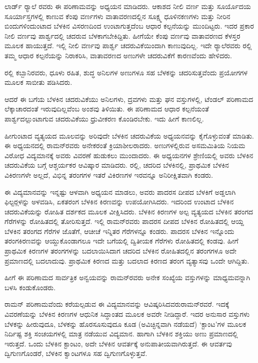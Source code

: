ಲಾರ್ಡ್ ರ‍್ಯಾಲೆ ರವರು ಈ ಪರಿಣಾಮವನ್ನು ಅಧ್ಯಯನ ಮಾಡಿದರು. ಆಕಾಶದ ನೀಲಿ ವರ್ಣ ಮತ್ತು ಸೂರ್ಯೊದಯ ಸೂರ್ಯಾಸ್ತಗಳಲ್ಲಿ ಕಾಣುವ ಕೆಂಪು ವರ್ಣಗಳು ವಾತಾವರಣದಲ್ಲಿನ ಸೂಕ್ಷ್ಮ ಧೂಳಿನಕಣಗಳು ಮತ್ತು ನೀರಿನ ಬಿಂದುಗಳಿಂದುಂಟಾದ ಬೆಳಕಿನ ವಿಸರಣದಿಂದ ಉಂಟಾಗುತ್ತದೆಂಬ ಆಧಾರ ಕಲ್ಪನೆಯನ್ನು ಮುಂದಿಟ್ಟರು. ಇದರ ಪ್ರಕಾರ ನೀಲಿ ವರ್ಣವು ಪಾರ್ಶ್ವದಲ್ಲಿ ಚದರುವ ಬೆಳಕಾಗಬೇಕಿದ್ದಿತು. ಹೀಗೆಯೇ ಕೆಂಪು ವರ್ಣವು ವಾತಾವರಣದ ಕೆಳಸ್ತರ ಮೂಲಕ ಹಾಯುತ್ತದೆ. ಇಲ್ಲಿ ನೀಲಿ ವರ್ಣವು ಪಾರ್ಶ್ವ ಚದರುವಿಕೆಯಿಂದಾಗಿ ಕಾಣುವುದಿಲ್ಲ. ಇದೇ ರ‍್ಯಾಲೆರವರು ರಲ್ಲಿ ತಮ್ಮ ಆಧಾರ ಕಲ್ಪನೆಯನ್ನು ನಿರಾಕರಿಸಿ, ವಾತಾವರಣದ ಅಣುಗಳೇ ಚದರುವಿಕೆಗೆ ಕಾರಣವೆಂದು ಹೇಳಿದರು.

\vskip 1pt

ರಲ್ಲಿ ಕಬ್ಬಾನಿರವರು, ಧೂಳು ರಹಿತ, ಶುದ್ಧ ಅನಿಲಗಳ ಅಣುಗಳೂ ಸಹ ಬೆಳಕನ್ನು ಚದರಿಸುತ್ತವೆಂದು ಪ್ರಯೋಗಗಳ ಮೂಲಕ ಸಾಬೀತು ಪಡಿಸಿದರು.

\vskip 1pt

ಆದರೆ ಈ ಬಗೆಯ ಬೆಳಕಿನ ಚದರುವಿಕೆಯು ಅನಿಲಗಳು, ದ್ರವಗಳು ಮತ್ತು ಘನ ವಸ್ತುಗಳಲ್ಲಿ, ಟೆಂಡಲ್ ಪರಿಣಾಮದ ಲೆಕ್ಕಾಚಾರದಂತೆ ಇರುವುದಿಲ್ಲವೆಂಬ ಅಂಶವು ತಿಳಿಯಿತು. ಈ ಪರಿಣಾಮದ ಆಧಾರ ಕಲ್ಪನೆಯಂತೆ ಪಾರ್ಶ್ವದಲ್ಲುಂಟಾಗುವ ಚದರುವಿಕೆಯು ಧ್ರುವೀಕರಣ ಕೊಂಡಿರಬೇಕು. ಇದು ಹೀಗೆ ಕಾಣಲಿಲ್ಲ.

\vskip 1pt

ಹೀಗುಂಟಾದ ವ್ಯತ್ಯಯದ ಮೂಲವನ್ನು ಅರಿವುದೇ ಬೆಳಕಿನ ಚದರುವಿಕೆಯ ಅಧ್ಯಯನವನ್ನು ಕೈಗೊಳ್ಳುವಂತೆ ಮಾಡಿತು. ಈ ಅಧ್ಯಯನದಲ್ಲಿ ರಾಮನ್‍ರವರು ಅನೇಕರಂತೆ ಕ್ರಿಯಾಶೀಲರಾದರು. ಅಣುಗಳಲ್ಲಿರುವ ಅಸಮಮಿತಿಯ ನಿಯಮ ವಿರೋಧ ವಿದ್ಯಮಾನಕ್ಕೆ ಅವರು ವಿವರಣೆ ಹುಡುಕಲು ಮುಂದಾದರು. ಈ ಅಧ್ಯಯನಗಳ ಶ್ರೇಣಿಯಲ್ಲಿ ಅವರು ಬೆಳಕಿನ ಚದರುವಿಕೆಯ ಬಗ್ಗೆ ಆಶ್ಚರ್ಯಕರ ಆವಿಷ್ಕಾರ ಮಾಡಿದರು. ರಲ್ಲಿ, ಚದರಿದ ಬೆಳಕಿನಲ್ಲಿ, ಪ್ರಾಥಮಿಕ ಬೆಳಕಿನ ವಿಕಿರಣಗಳೇ ಅಲ್ಲದೆ, ವಿಭಿನ್ನ ತರಂಗಗಳ ಇತರೆ ವಿಕಿರಣಗಳ ಇರವನ್ನೂ ಅನಿರೀಕ್ಷಿತವಾಗಿ ಕಂಡರು.

ಈ ವಿದ್ಯಮಾನವನ್ನು ಇನ್ನಷ್ಟು ಆಳವಾಗಿ ಅಧ್ಯಯನ ಮಾಡಲು, ಅವರು ಪಾದರಸ ದೀಪದ ಬೆಳಕಿಗೆ ಅಡ್ಡಲಾಗಿ ಫಿಲ್ಟರ್‍ಗಳನ್ನು ಅಳವಡಿಸಿ, ಏಕತರಂಗ ಬೆಳಕಿನ ಕಿರಣವನ್ನು ಉಪಯೋಗಿಸಿದರು. ಇದರಿಂದ ಉಂಟಾದ ಬೆಳಕಿನ ಚದರುವಿಕೆಯನ್ನು ರೋಹಿತ ದರ್ಶಕದ ಮೂಲಕ ವೀಕ್ಷಿಸಿದರು. ಬೆಳಕಿನ ಕಿರಣಗಳ ಅಲ್ಪ ವ್ಯತ್ಯಯದ ಬೆಳಕಿನ ತರಂಗದ ಗೆರೆಗಳನ್ನು ರೋಹಿತದಲ್ಲಿ ತೋರಿಸುತ್ತದೆ. ಇಲ್ಲಿ ರಾಮನ್‍ರವರು ಪಾದರಸ ದೀಪದ ಬೆಳಕಿನ ರೋಹಿತದಲ್ಲಿ ಆಯ್ದ ಬೆಳಕಿನ ತರಂಗದ ಗೆರೆಗಳ ಜೊತೆಗೆ, ಆಚೀಚೆ ಇನ್ನಿತರ ಗೆರೆಗಳನ್ನೂ ಕಂಡರು. ಪಾದರಸ ಬೆಳಕಿನ ಇನ್ನೊಂದು ತರಂಗ\enginline{-}ಕಿರಣವನ್ನು ಆಯ್ದುಕೊಂಡಾಗಲೂ ಇದೇ ಬಗೆಯಲ್ಲಿ ದ್ವಿತೀಯಕ ಗೆರೆಗಳು ರೋಹಿತದಲ್ಲಿ ಕಂಡವು. ಹೀಗೆ ಪ್ರಾಥಮಿಕ ಕಿರಣಗಳ ತರಂಗಗಳನ್ನು ಬದಲಾಯಿಸಿದಾಗ ಚದರಿದ ಬೆಳಕಿನ ರೋಹಿತದಲ್ಲಿನ ತರಂಗಗಳೂ ಅದೇ ಪ್ರಮಾಣದಲ್ಲಿ ಬದಲಾದುವು. ಪ್ರಾಥಮಿಕ ಕಿರಣದ ಮತ್ತು ಬದಲಾದ ಕಿರಣದ ತರಂಗ ವ್ಯತ್ಯಾಸವು ಒಂದೇ ಆಗಿದ್ದಿತು.

ಹೀಗೆ ಈ ಪರಿಣಾಮದ ಸಾರ್ವತ್ರಿಕ ಅನ್ವಯವನ್ನು ರಾಮನ್‍ರವರು ಅನೇಕ ಸಂಖ್ಯೆಯ ವಸ್ತುಗಳನ್ನು ಮಾಧ್ಯಮವನ್ನಾಗಿ ಬಳಸಿ ಕಂಡುಕೊಂಡರು.

ರಾಮನ್ ಪರಿಣಾಮವೆಂದು ಕರೆಯಲ್ಪಡುವ ಈ ವಿದ್ಯಮಾನವನ್ನು ಆವಿಷ್ಕರಿಸಿದವರು\break ರಾಮನ್‍ರವರೆ. ಇದಕ್ಕೆ ವಿವರಣೆಯನ್ನು ಬೆಳಕಿನ ಕಿರಣಗಳ ಆಧುನಿಕ ಸಿದ್ಧಾಂತದ ಮೂಲಕ ಅವರೇ ನೀಡಿದ್ದಾರೆ. ಇದರ ಅನುಸಾರ ವಸ್ತುಗಳು ಬೆಳಕನ್ನು ಹೀರುವುದೂ, ಬೆಳಕನ್ನು ಹೊರಸೂಸುವುದೂ ಕೂಡ (ಅವಿಚ್ಛಿನ್ನವಾಗಿ ನಡೆಯದೆ) ‘ಕ್ಟಾಂಟ’ಗಳ ಮೂಲಕ ನಿರ್ದಿಷ್ಟ ಶಕ್ತಿ ಸಂಚಯಗಳಲ್ಲಿ ಮಾತ್ರ ನಡೆಯುವ ವಿದ್ಯಮಾನ. ಹಾಗಾಗಿ ಬೆಳಕಿನ ಶಕ್ತಿಯು ಅಣು ಪ್ರಮಾಣದಲ್ಲಿ ಇರುತ್ತದೆ. ಒಂದು ಬೆಳಕಿನ ಕ್ಟಾಂಟಂ, ಅದೇ ಬೆಳಕಿನ ಆವರ್ತಕ್ಕೆ ಅನುಪಾತೀಯವಾಗಿರುತ್ತದೆ. ಈ ಆವರ್ತವು ದ್ವಿಗುಣಗೊಂಡರೆ, ಬೆಳಕಿನ ಕ್ವಾಂಟಗಳೂ ಸಹ ದ್ವಿಗುಣಗೊಳ್ಳುತ್ತವೆ.


